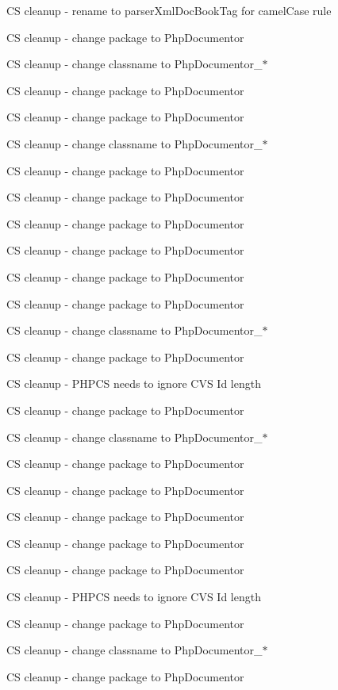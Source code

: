 \begin{DoxyRefList}
\-C\-S cleanup -\/ rename to parser\-Xml\-Doc\-Book\-Tag for camel\-Case rule 

\-C\-S cleanup -\/ change package to \-Php\-Documentor 

\-C\-S cleanup -\/ change classname to \-Php\-Documentor\-\_\-$\ast$ 

\-C\-S cleanup -\/ change package to \-Php\-Documentor 

\-C\-S cleanup -\/ change package to \-Php\-Documentor 

\-C\-S cleanup -\/ change classname to \-Php\-Documentor\-\_\-$\ast$ 

\-C\-S cleanup -\/ change package to \-Php\-Documentor 

\-C\-S cleanup -\/ change package to \-Php\-Documentor  

\-C\-S cleanup -\/ change package to \-Php\-Documentor 

\-C\-S cleanup -\/ change package to \-Php\-Documentor 

\-C\-S cleanup -\/ change package to \-Php\-Documentor 

\-C\-S cleanup -\/ change package to \-Php\-Documentor 

\-C\-S cleanup -\/ change classname to \-Php\-Documentor\-\_\-$\ast$ 

\-C\-S cleanup -\/ change package to \-Php\-Documentor 

\-C\-S cleanup -\/ \-P\-H\-P\-C\-S needs to ignore \-C\-V\-S \-Id length 

\-C\-S cleanup -\/ change package to \-Php\-Documentor 

\-C\-S cleanup -\/ change classname to \-Php\-Documentor\-\_\-$\ast$ 

\-C\-S cleanup -\/ change package to \-Php\-Documentor 

\-C\-S cleanup -\/ change package to \-Php\-Documentor 

\-C\-S cleanup -\/ change package to \-Php\-Documentor 

\-C\-S cleanup -\/ change package to \-Php\-Documentor 

\-C\-S cleanup -\/ change package to \-Php\-Documentor 

\-C\-S cleanup -\/ \-P\-H\-P\-C\-S needs to ignore \-C\-V\-S \-Id length 

\-C\-S cleanup -\/ change package to \-Php\-Documentor 

\-C\-S cleanup -\/ change classname to \-Php\-Documentor\-\_\-$\ast$ 

\-C\-S cleanup -\/ change package to \-Php\-Documentor 


\end{DoxyRefList}
